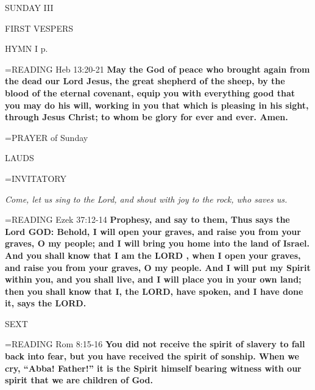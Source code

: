 \begin{center}\normalsize SUNDAY III\\
\end{center}

\begin{flushleft}\normalsize FIRST VESPERS\\\end{flushleft}

HYMN I p. \pageref{ordinaryTime:firstHymn}

\hangindent=\parindent \small{READING} Heb 13:20-21 \textbf{May the God of peace who brought again from the dead our Lord Jesus, the great shepherd of the sheep, by the blood of the eternal covenant, equip you with everything good that you may do his will, working in you that which is pleasing in his sight, through Jesus Christ; to whom be glory for ever and ever.  Amen.\\}

\hangindent=\parindent \small{PRAYER  of Sunday}

\begin{flushleft}\normalsize LAUDS\\\end{flushleft}

\hangindent=\parindent \small{INVITATORY}
\begin{center}
\textit{Come, let us sing to the Lord, and shout with joy to the rock, who saves us.\\}
\end{center}

\hangindent=\parindent \small{READING} Ezek 37:12-14 \textbf{Prophesy, and say to them, Thus says the Lord GOD: Behold, I will open your graves, and raise you from your graves, O my people; and I will bring you home into the land of Israel. And you shall know that I am the LORD , when I open your graves, and raise you from your graves, O my people. And I will put my Spirit within you, and you shall live, and I will place you in your own land; then you shall know that I, the LORD, have spoken, and I have done it, says the LORD.\\}

\begin{flushleft}\normalsize SEXT\\\end{flushleft}

\hangindent=\parindent \small{READING} Rom 8:15-16 \textbf{You did not receive the spirit of slavery to fall back into fear, but you have received the spirit of sonship. When we cry, “Abba! Father!” it is the Spirit himself bearing witness with our spirit that we are children of God. }

